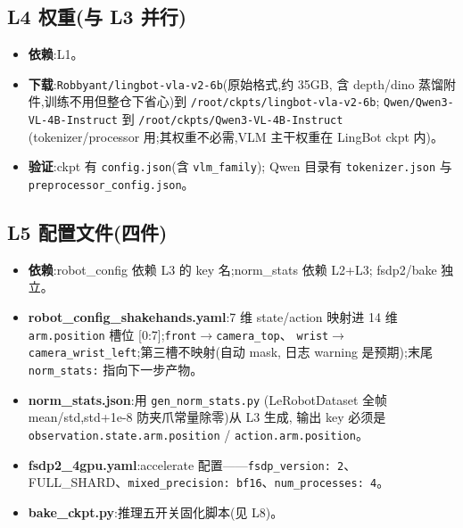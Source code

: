 \documentclass[11pt]{ctexart}
\begin{document}
\subsection{L4 权重(与 L3 并行)}
\begin{itemize}
\item \textbf{依赖}:L1。
\item \textbf{下载}:\texttt{Robbyant/lingbot-vla-v2-6b}(原始格式,约 35GB,
含 depth/dino 蒸馏附件,训练不用但整仓下省心)到
\texttt{/root/ckpts/lingbot-vla-v2-6b};
\texttt{Qwen/Qwen3-VL-4B-Instruct} 到 \texttt{/root/ckpts/Qwen3-VL-4B-Instruct}
(tokenizer/processor 用;其权重不必需,VLM 主干权重在 LingBot ckpt 内)。
\item \textbf{验证}:ckpt 有 \texttt{config.json}(含 \texttt{vlm\_family});
Qwen 目录有 \texttt{tokenizer.json} 与\newline \texttt{preprocessor\_config.json}。
\end{itemize}

\subsection{L5 配置文件(四件)}
\begin{itemize}
\item \textbf{依赖}:robot\_config 依赖 L3 的 key 名;norm\_stats 依赖 L2+L3;
fsdp2/bake 独立。
\item \textbf{robot\_config\_shakehands.yaml}:7 维 state/action 映射进 14 维
\texttt{arm.position} 槽位 [0:7];\texttt{front}$\to$\texttt{camera\_top}、
\texttt{wrist}$\to$\texttt{camera\_wrist\_left};第三槽不映射(自动 mask,
日志 warning 是预期);末尾 \texttt{norm\_stats:} 指向下一步产物。
\item \textbf{norm\_stats.json}:用 \texttt{gen\_norm\_stats.py}
(LeRobotDataset 全帧 mean/std,std+1e-8 防夹爪常量除零)从 L3 生成,
输出 key 必须是 \texttt{observation.state.arm.position} /
\texttt{action.arm.position}。
\item \textbf{fsdp2\_4gpu.yaml}:accelerate 配置——\texttt{fsdp\_version: 2}、
FULL\_SHARD、\texttt{mixed\_precision: bf16}、\texttt{num\_processes: 4}。
\item \textbf{bake\_ckpt.py}:推理五开关固化脚本(见 L8)。
\end{itemize}
\end{document}

